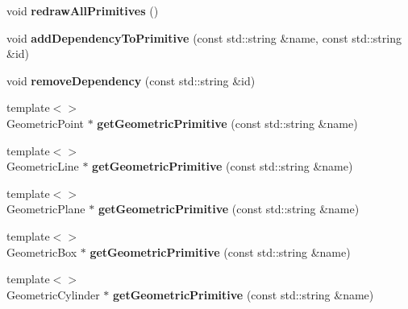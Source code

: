 \begin{DoxyCompactItemize}
\item 
\hypertarget{classhiqp_1_1GeometricPrimitiveMap_a85a723b6f82c1bf05e9d7e6dc48670fe}{void {\bfseries redraw\-All\-Primitives} ()}\label{classhiqp_1_1GeometricPrimitiveMap_a85a723b6f82c1bf05e9d7e6dc48670fe}

\item 
\hypertarget{classhiqp_1_1GeometricPrimitiveMap_a056ec1d14ec10da2b3e0b6168118d3c1}{void {\bfseries add\-Dependency\-To\-Primitive} (const std\-::string \&name, const std\-::string \&id)}\label{classhiqp_1_1GeometricPrimitiveMap_a056ec1d14ec10da2b3e0b6168118d3c1}

\item 
\hypertarget{classhiqp_1_1GeometricPrimitiveMap_aa2a1b54ea628e79cc8241db5d34785e7}{void {\bfseries remove\-Dependency} (const std\-::string \&id)}\label{classhiqp_1_1GeometricPrimitiveMap_aa2a1b54ea628e79cc8241db5d34785e7}

\item 
\hypertarget{classhiqp_1_1GeometricPrimitiveMap_a0f77187272f55c3da8d9f3441d97a184}{{\footnotesize template$<$$>$ }\\Geometric\-Point $\ast$ {\bfseries get\-Geometric\-Primitive} (const std\-::string \&name)}\label{classhiqp_1_1GeometricPrimitiveMap_a0f77187272f55c3da8d9f3441d97a184}

\item 
\hypertarget{classhiqp_1_1GeometricPrimitiveMap_ae7d8d3d63f24043417e135e5de5af324}{{\footnotesize template$<$$>$ }\\Geometric\-Line $\ast$ {\bfseries get\-Geometric\-Primitive} (const std\-::string \&name)}\label{classhiqp_1_1GeometricPrimitiveMap_ae7d8d3d63f24043417e135e5de5af324}

\item 
\hypertarget{classhiqp_1_1GeometricPrimitiveMap_af3342ef328e2e62812af9f408befb7b2}{{\footnotesize template$<$$>$ }\\Geometric\-Plane $\ast$ {\bfseries get\-Geometric\-Primitive} (const std\-::string \&name)}\label{classhiqp_1_1GeometricPrimitiveMap_af3342ef328e2e62812af9f408befb7b2}

\item 
\hypertarget{classhiqp_1_1GeometricPrimitiveMap_afdf3ae135b8cf7fedc96767b80a681c8}{{\footnotesize template$<$$>$ }\\Geometric\-Box $\ast$ {\bfseries get\-Geometric\-Primitive} (const std\-::string \&name)}\label{classhiqp_1_1GeometricPrimitiveMap_afdf3ae135b8cf7fedc96767b80a681c8}

\item 
\hypertarget{classhiqp_1_1GeometricPrimitiveMap_a57f5b21aeade9e6c2e758aebb1d5661d}{{\footnotesize template$<$$>$ }\\Geometric\-Cylinder $\ast$ {\bfseries get\-Geometric\-Primitive} (const std\-::string \&name)}\label{classhiqp_1_1GeometricPrimitiveMap_a57f5b21aeade9e6c2e758aebb1d5661d}


\end{DoxyCompactItemize}
